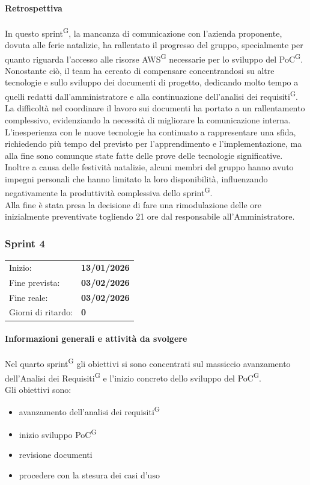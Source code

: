 \documentclass[a4paper, 11pt]{article}
\newcommand{\subsubsubsection}[1]{\paragraph{#1}}
\begin{document}
\subsubsubsection{Retrospettiva}
In questo sprint\textsuperscript{G}, la mancanza di comunicazione con l'azienda proponente, dovuta alle ferie natalizie, ha rallentato il progresso del gruppo, specialmente per quanto riguarda l'accesso alle risorse AWS\textsuperscript{G} necessarie per lo sviluppo del PoC\textsuperscript{G}. Nonostante ciò, il team ha cercato di compensare concentrandosi su altre tecnologie e sullo sviluppo dei documenti di progetto, dedicando molto tempo a quelli redatti dall'amministratore e alla continuazione dell'analisi dei requisiti\textsuperscript{G}. \\
La difficoltà nel coordinare il lavoro sui documenti ha portato a un rallentamento complessivo, evidenziando la necessità di migliorare la comunicazione interna. \\
L'inesperienza con le nuove tecnologie ha continuato a rappresentare una sfida, richiedendo più tempo del previsto per l'apprendimento e l'implementazione, ma alla fine sono comunque state fatte delle prove delle tecnologie significative.
Inoltre a causa delle festività natalizie, alcuni membri del gruppo hanno avuto impegni personali che hanno limitato la loro disponibilità, influenzando negativamente la produttività complessiva dello sprint\textsuperscript{G}.\\
Alla fine è stata presa la decisione di fare una rimodulazione delle ore inizialmente preventivate togliendo 21 ore dal responsabile all'Amministratore.






\newpage










\subsubsection{Sprint 4}
\begin{tabular}{ll}
Inizio: & \textbf{13/01/2026} \\
Fine prevista: & \textbf{03/02/2026} \\
Fine reale: & \textbf{03/02/2026} \\
Giorni di ritardo: & \textbf{0} \\
\end{tabular}


\subsubsubsection{Informazioni generali e attività da svolgere}
Nel quarto sprint\textsuperscript{G} gli obiettivi si sono concentrati sul massiccio avanzamento dell'Analisi dei Requisiti\textsuperscript{G} e l'inizio concreto dello sviluppo del PoC\textsuperscript{G}. \\
Gli obiettivi sono:
\begin{itemize}
  \item avanzamento dell'analisi dei requisiti\textsuperscript{G}
  \item inizio sviluppo PoC\textsuperscript{G}
  \item revisione documenti
  \item procedere con la stesura dei casi d'uso
\end{itemize}
\end{document}
